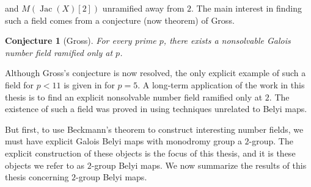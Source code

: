 \documentclass{dcthesis}
\newcommand{\defi}[1]{\textsf{#1}}
\DeclareMathOperator{\Jac}{Jac}
\numberwithin{equation}{section}
\newtheorem{conj}[equation]{Conjecture}
\theoremstyle{definition}
\theoremstyle{remark}
\begin{document}
{{{    and $M(\Jac(X)[2])$ unramified away from $2$.
    The main interest in finding such a field
    comes from a conjecture
    (now theorem) of Gross.
    \begin{conj}[Gross]
      \label{conj:gross}
      For every prime $p$,
      there exists a nonsolvable Galois
      number field
      ramified only at $p$.
    \end{conj}
    Although Gross's conjecture is now resolved,
    the only explicit example of such
    a field for $p<11$ is given
    in \cite{roberts5} for $p=5$.
    A long-term application of the work
    in this thesis is to
    find an explicit nonsolvable number field
    ramified only at $2$.
    The existence of such a field was proved
    in \cite{lassina} using techniques
    unrelated to Belyi maps.
    \par
    But first, to use Beckmann's theorem
    to construct interesting number fields,
    we must have explicit
    Galois Belyi maps with monodromy group
    a $2$-group.
    The explicit construction of these
    objects is the focus of this thesis,
    and it is these objects we refer to as
    \defi{$2$-group Belyi maps}.
    We now summarize the results of this thesis
    concerning
    $2$-group Belyi maps.
  }
}}
\end{document}
